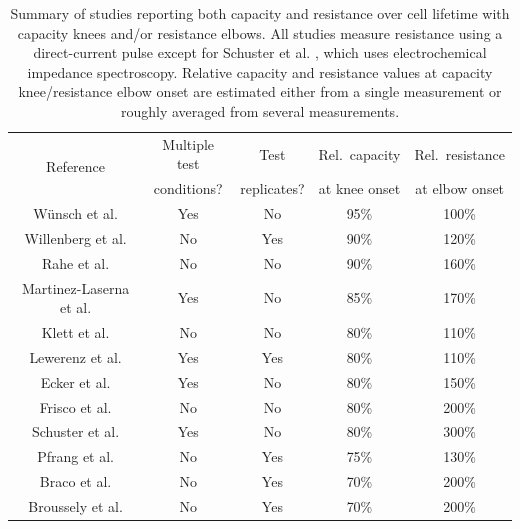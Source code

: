 \documentclass[journal=jpclcd,manuscript=article]{achemso}
\begin{document}
\begin{table}[!ht]
    \centering
    \begin{tabular}{|c||c|c|c|c|}
        \hline
\multirow{2}{*}{Reference}
& Multiple test & Test        & Rel.~capacity & Rel.~resistance \\
& conditions?   & replicates? & at knee onset & at elbow onset \\
        \hline
        Wünsch et al.\cite{wunsch_investigation_2019} & Yes & No & 95\% & 100\% \\
        Willenberg et al.\cite{willenberg_development_2020} & No & Yes & 90\% & 120\% \\
        Rahe et al.\cite{rahe_nanoscale_2019} & No & No & 90\% & 160\% \\
        Martinez-Laserna et al.\cite{martinez-laserna_technical_2018} & Yes & No &  85\% & 170\% \\
        Klett et al.\cite{klett_non-uniform_2014} & No & No & 80\% & 110\% \\
        Lewerenz et al.\cite{lewerenz_systematic_2017, lewerenz_post-mortem_2017} & Yes & Yes & 80\% & 110\% \\
        Ecker et al.\cite{ecker_calendar_2014} & Yes & No & 80\% & 150\% \\
        Frisco et al.\cite{frisco_understanding_2016} & No & No & 80\% & 200\% \\
        Schuster et al.\cite{schuster_nonlinear_2015} & Yes & No & 80\% & 300\% \\
        Pfrang et al.\cite{pfrang_long-term_2018} & No & Yes & 75\% & 130\% \\
        Braco et al.\cite{braco_experimental_2020} & No & Yes & 70\% & 200\% \\
        Broussely et al.\cite{broussely_main_2005} & No & Yes & 70\% & 200\% \\
        \hline
    \end{tabular}
    \caption{Summary of studies reporting both capacity and resistance over cell lifetime with capacity knees and/or resistance elbows. All studies measure resistance using a direct-current pulse except for Schuster et al. \cite{schuster_nonlinear_2015}, which uses electrochemical impedance spectroscopy. Relative capacity and resistance values at capacity knee/resistance elbow onset are estimated either from a single measurement or roughly averaged from several measurements.}
    \label{tab:dcr_growth_papers}
\end{table}


\end{document}
